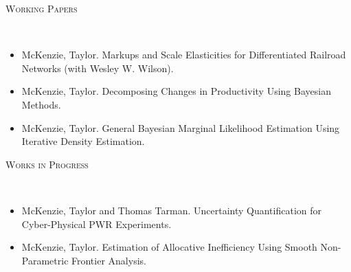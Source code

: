 \documentclass[11pt]{article}
\newenvironment{changemargin}[2]{%
  \begin{list}{}{%
    \setlength{\topsep}{0pt}%
    \setlength{\leftmargin}{#1}%
    \setlength{\rightmargin}{#2}%
    \setlength{\listparindent}{\parindent}%
    \setlength{\itemindent}{\parindent}%
    \setlength{\parsep}{\parskip}%
  }%
  \item[]}{\end{list}
}
\newcommand{\lineover}{
	\begin{changemargin}{-0.05in}{-0.05in}
		\vspace*{-8pt}
		\hrulefill \\
		\vspace*{-2pt}
	\end{changemargin}
}
\newcommand{\header}[1]{
	\begin{changemargin}{-0.5in}{-0.5in}
		\scshape{#1}\\
	\vspace*{-5pt}
  	\lineover
	\end{changemargin}
}
\newenvironment{body} {
	\vspace*{-16pt}
	\begin{changemargin}{-0.25in}{-0.5in}
  }	
	{\end{changemargin}
}
\begin{document}
\smallskip
\header{Working Papers}

\begin{body}
\vspace{14pt}
\begin{itemize}
	\item McKenzie, Taylor. Markups and Scale Elasticities for Differentiated Railroad Networks (with Wesley W. Wilson).
	\item McKenzie, Taylor. Decomposing Changes in Productivity Using Bayesian Methods.
	\item McKenzie, Taylor. General Bayesian Marginal Likelihood Estimation Using Iterative Density Estimation.
\end{itemize}
\end{body}

\smallskip
\header{Works in Progress}

\begin{body}
	\vspace{14pt}
	\begin{itemize}
		\item McKenzie, Taylor and Thomas Tarman. Uncertainty Quantification for Cyber-Physical PWR Experiments.
		\item McKenzie, Taylor. Estimation of Allocative Inefficiency Using Smooth Non-Parametric Frontier Analysis.
	\end{itemize}
\end{body}
\end{document}
